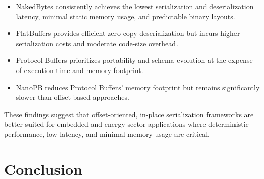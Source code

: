 \documentclass[11pt, a4paper]{article}
\begin{document}
\begin{itemize}
    \item NakedBytes consistently achieves the lowest serialization and deserialization latency, minimal static memory usage, and predictable binary layouts.
    \item FlatBuffers provides efficient zero-copy deserialization but incurs higher serialization costs and moderate code-size overhead.
    \item Protocol Buffers prioritizes portability and schema evolution at the expense of execution time and memory footprint.
    \item NanoPB reduces Protocol Buffers’ memory footprint but remains significantly slower than offset-based approaches.
\end{itemize}

These findings suggest that offset-oriented, in-place serialization frameworks are better suited for embedded and energy-sector applications where deterministic performance, low latency, and minimal memory usage are critical.


\section{Conclusion}
\end{document}
